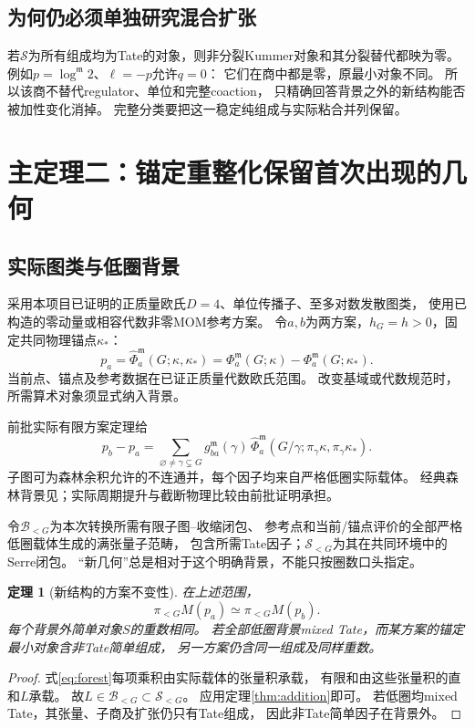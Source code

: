 \documentclass[11pt,a4paper]{ctexart}
\theoremstyle{cnplain}\newtheorem{theorem}{定理}[section]
\theoremstyle{definition}\newtheorem{definition}[theorem]{定义}
\theoremstyle{remark}\newtheorem{remark}[theorem]{注}
\newcommand{\cS}{\mathcal S}\newcommand{\dR}{\mathrm{dR}}
\begin{document}
\subsection{为何仍必须单独研究混合扩张}
若$\cS$为所有组成均为Tate的对象，则非分裂Kummer对象和其分裂替代都映为零。
例如$p=\log^{\mathfrak m}2$、$\ell=-p$允许$q=0$：
它们在商中都是零，原最小对象不同。
所以该商不替代regulator、单位和完整coaction，
只精确回答背景之外的新结构能否被加性变化消掉。
完整分类要把这一稳定纯组成与实际粘合并列保留。

\section{主定理二：锚定重整化保留首次出现的几何}
\subsection{实际图类与低圈背景}
采用本项目已证明的正质量欧氏$D=4$、单位传播子、至多对数发散图类，
使用已构造的零动量或相容代数非零MOM参考方案。
令$a,b$为两方案，$h_G=h>0$，固定共同物理锚点$\kappa_*$：
\[
 p_a=\widehat\Phi_a^{\mathfrak m}(G;\kappa,\kappa_*)
 =\Phi_a^{\mathfrak m}(G;\kappa)-\Phi_a^{\mathfrak m}(G;\kappa_*).
\]
当前点、锚点及参考数据在已证正质量代数欧氏范围。
改变基域或代数规范时，所需算术对象须显式纳入背景。

前批实际有限方案定理给
\begin{equation}\label{eq:forest}
 p_b-p_a=\sum_{\varnothing\ne\gamma\subsetneq G}
 g_{ba}^{\mathfrak m}(\gamma)\,
 \widehat\Phi_a^{\mathfrak m}
 (G/\gamma;\pi_\gamma\kappa,\pi_\gamma\kappa_*).
\end{equation}
子图可为森林余积允许的不连通并，每个因子均来自严格低圈实际载体。
经典森林背景见\cite{BK}；实际周期提升与截断物理比较由前批证明承担。

令$\mathcal B_{<G}$为本次转换所需有限子图--收缩闭包、
参考点和当前/锚点评价的全部严格低圈载体生成的满张量子范畴，
包含所需Tate因子；$\cS_{<G}$为其在共同环境中的Serre闭包。
“新几何”总是相对于这个明确背景，不能只按圈数口头指定。

\begin{theorem}[新结构的方案不变性]\label{thm:ren}
在上述范围，
\[
 \pi_{<G}M(p_a)\simeq\pi_{<G}M(p_b).
\]
每个背景外简单对象$S$的重数相同。
若全部低圈背景mixed Tate，而某方案的锚定最小对象含非Tate简单组成，
另一方案仍含同一组成及同样重数。
\end{theorem}
\begin{proof}
式\eqref{eq:forest}每项乘积由实际载体的张量积承载，
有限和由这些张量积的直和$L$承载。
故$L\in\mathcal B_{<G}\subset\cS_{<G}$。
应用定理\ref{thm:addition}即可。
若低圈均mixed Tate，其张量、子商及扩张仍只有Tate组成，
因此非Tate简单因子在背景外。
\end{proof}
\end{document}

